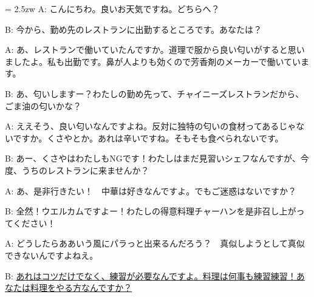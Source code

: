 \documentclass[11pt]{amsart}
\title{}
\author{}
\newenvironment{hangall}[1]{\hangindent = 2.5zw\everypar{\hangindent = 2.5zw}}{}
\begin{document}
\maketitle
\begin{hangall}{}%
A: こんにちわ。良いお天気ですね。どちらへ？

B: 今から、勤め先のレストランに出勤するところです。あなたは？

A: あ、レストランで働いていたんですか。道理で服から良い匂いがすると思いましたよ。私も出勤です。鼻が人よりも効くので芳香剤のメーカーで働いています。

B: あ、匂いしますー？わたしの勤め先って、チャイニーズレストランだから、ごま油の匂いかな？

A: ええそう、良い匂いなんですよね。反対に独特の匂いの食材ってあるじゃないですか。くさやとか。あれは辛いですね。そもそも食べられないです。

B: あー、くさやはわたしもNGです！わたしはまだ見習いシェフなんですが、今度、うちのレストランに来ませんか？

A: あ、是非行きたい！　中華は好きなんですよ。でもご迷惑はないですか？

B: 全然！ウエルカムですよー！わたしの得意料理チャーハンを是非召し上がってください！

A: どうしたらああいう風にパラっと出来るんだろう？　真似しようとして真似できないんですよねえ。

B: \ul{あれはコツだけでなく、練習が必要なんですよ。料理は何事も練習練習！あなたは料理をやる方なんですか？}\end{hangall}
\end{document}
